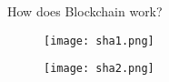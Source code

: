 \begin{frame}{How does Blockchain work?}
    \begin{itemize}
        \begin{figure}[h!]
            \centering
            \hspace*{-1.2cm}
            \texttt{[image: sha1.png]}
            \centering
        \end{figure}
        \begin{figure}[h!]
            \centering
            \hspace*{-1.2cm}
            \texttt{[image: sha2.png]}
            \centering
        \end{figure}
    \end{itemize}
\end{frame}